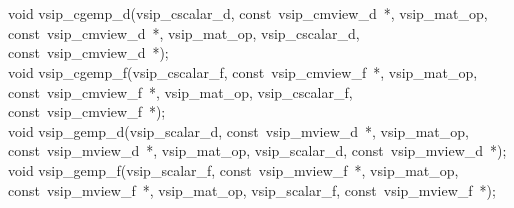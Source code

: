 \\\cvsiplh
\\\begin{cfuncs}
void vsip\_cgemp\_d(vsip\_cscalar\_d, const~vsip\_cmview\_d~*, vsip\_mat\_op, const~vsip\_cmview\_d~*, vsip\_mat\_op, vsip\_cscalar\_d, const~vsip\_cmview\_d~*);\\
void vsip\_cgemp\_f(vsip\_cscalar\_f, const~vsip\_cmview\_f~*, vsip\_mat\_op, const~vsip\_cmview\_f~*, vsip\_mat\_op, vsip\_cscalar\_f, const~vsip\_cmview\_f~*);\\
void vsip\_gemp\_d(vsip\_scalar\_d, const~vsip\_mview\_d~*, vsip\_mat\_op, const~vsip\_mview\_d~*, vsip\_mat\_op, vsip\_scalar\_d, const~vsip\_mview\_d~*);\\
void vsip\_gemp\_f(vsip\_scalar\_f, const~vsip\_mview\_f~*, vsip\_mat\_op, const~vsip\_mview\_f~*, vsip\_mat\_op, vsip\_scalar\_f, const~vsip\_mview\_f~*);\\
\end{cfuncs}
\pyjvsiph
{}
